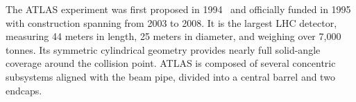 


The ATLAS experiment was first proposed in 1994~\cite{atlas_technical_proposal} and officially funded in 1995 with construction spanning from 2003 to 2008. It is the largest LHC detector, measuring 44 meters in length, 25 meters in diameter, and weighing over 7,000 tonnes. Its symmetric cylindrical geometry provides nearly full solid-angle coverage around the collision point. ATLAS is composed of several concentric subsystems aligned with the beam pipe, divided into a central barrel and two endcaps.

